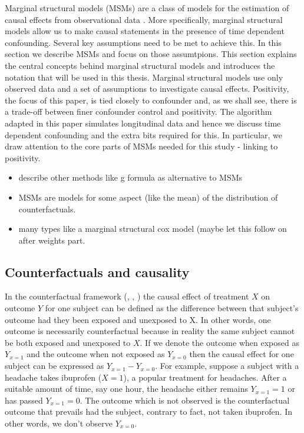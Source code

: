 \documentclass[11pt]{article}
\providecommand{\tightlist}{%
      \setlength{\itemsep}{0pt}\setlength{\parskip}{0pt}}
\begin{document}
Marginal structural models (MSMs) are a class of models for the
estimation of causal effects from observational data \citet{Robins2000}.
More specifically, marginal structural models allow us to make causal
statements in the presence of time dependent confounding. Several key
assumptions need to be met to achieve this. In this section we describe
MSMs and focus on those assumtpions. This section explains the central
concepts behind marginal structural models and introduces the notation
that will be used in this thesis. Marginal structural models use only
observed data and a set of assumptions to investigate causal effects.
Positivity, the focus of this paper, is tied closely to confounder and,
as we shall see, there is a trade-off between finer confounder control
and positivity. The algorithm adapted in this paper simulates
longitudinal data and hence we discuss time dependent confounding and
the extra bits required for this. In particular, we draw attention to
the core parts of MSMs needed for this study - linking to positivity.

\begin{itemize}
\tightlist
\item
  describe other methods like g formula as alternative to MSMs
\item
  MSMs are models for some aspect (like the mean) of the distribution of
  counterfactuals.
\item
  many types like a marginal structural cox model (maybe let this follow
  on after weights part.
\end{itemize}

    \subsection{Counterfactuals and
causality}\label{counterfactuals-and-causality}

In the counterfactual framework (\citet{Neyman1923}, \citet{Rubin1978},
\citet{Robins1986}) the causal effect of treatment \(X\) on outcome
\(Y\) for one subject can be defined as the difference between that
subject's outcome had they been exposed and unexposed to X. In other
words, one outcome is necessarily counterfactual because in reality the
same subject cannot be both exposed and unexposed to \(X\). If we denote
the outcome when exposed as \(Y_{x=1}\) and the outcome when not exposed
as \(Y_{x=0}\) then the causal effect for one subject can be expressed
as \(Y_{x=1} - Y_{x=0}\). For example, suppose a subject with a headache
takes ibuprofen (\(X = 1\)), a popular treatment for headaches. After a
suitable amount of time, say one hour, the headache either remains
\(Y_{x=1} = 1\) or has passed \(Y_{x=1} = 0\). The outcome which is not
observed is the counterfactual outcome that prevails had the subject,
contrary to fact, not taken ibuprofen. In other words, we don't observe
\(Y_{x=0}\). \linebreak
\end{document}
